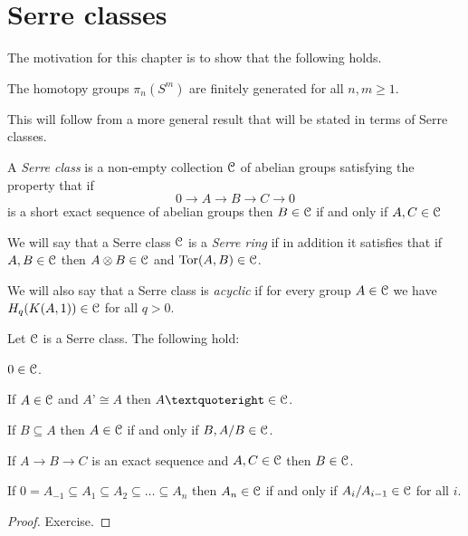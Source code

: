 

\chapter[Serre classes]{Serre classes}
\label{SERRE CLASSES CHAPTER}
\thispagestyle{firststyle}


The motivation for this chapter is to show that the following holds.

\begin{theorem}
\label{HOMOTOPY GPS SPHERES THM}
The homotopy groups $\pi_{n}(S^{m})$ are finitely generated for all $n, m \geq 1$.
\end{theorem}

This will follow from a more general result that will be stated in terms 
of Serre classes.

\begin{definition}
A \emph{Serre class} is a non-empty collection ${\mathcal C}$ of abelian groups satisfying 
the property that if 
\[
0 \to A \to B \to C \to 0
\]
is a short exact sequence of abelian groups then $B\in {\mathcal C}$ if and only if 
$A, C \in {\mathcal C}$

We will say that a Serre class ${\mathcal C}$ is a \emph{Serre ring} if in addition 
it satisfies that if $A, B \in {\mathcal C}$ then $A\otimes B \in {\mathcal C}$ and 
$\operatorname{Tor}(A, B)\in {\mathcal C}$. 

We will also say that a Serre class is \emph{acyclic} if for every group $A\in {\mathcal C}$
we have $H_{q}(K(A, 1)) \in {\mathcal C}$ for all $q >0$. 
\end{definition}

\begin{proposition}
Let ${\mathcal C}$ is a Serre class. The following hold:
\benu
\item $0 \in {\mathcal C}$.
\item If $A \in {\mathcal C}$ and $A’\cong A$ then $A’ \in \ccal$.
\item If $B\subseteq A$ then $A\in {\mathcal C}$ if and only if $B, A/B \in {\mathcal C}$.
\item If $A \to B \to C$ is an exact sequence and $A, C \in {\mathcal C}$ then $B\in {\mathcal C}$.
\item If $0 = A_{-1} \subseteq A_{1} \subseteq A_{2} \subseteq {\dots} \subseteq A_{n}$
then $A_{n}\in {\mathcal C}$ if and only if $A_{i}/A_{i-1} \in {\mathcal C}$ for all $i$. 
\eenu
\end{proposition}

\begin{proof}
Exercise.
\end{proof}

